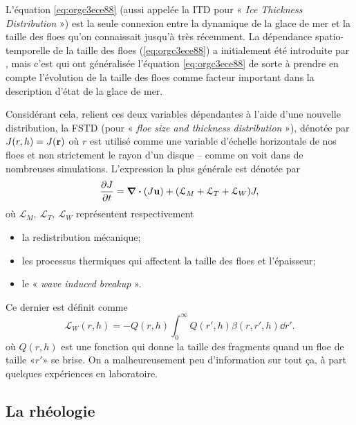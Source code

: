 \documentclass[10pt]{article}
\numberwithin{equation}{section}
\newcommand{\uu}{\vb{u}}
\begin{document}
L'équation \ref{eq:orgc3ece88} (aussi appelée la ITD pour « \emph{Ice Thickness Distribution} »)  est la seule connexion entre la dynamique de la glace de mer et la taille des floes qu'on connaissait jusqu'à très récemment.
La dépendance spatio-temporelle de la taille des floes (\ref{eq:orgc3ece88}) a initialement été introduite par \Textcite{zhang2015sea}, mais c'est \Textcite{horvat2015prognostic} qui ont généralisée l'équation \ref{eq:orgc3ece88} de sorte à prendre en compte l'évolution de la taille des floes comme facteur important dans la description d'état de la glace de mer.\bigskip

Considérant cela, \Textcite{horvat2015prognostic} relient ces deux variables dépendantes à l'aide d'une nouvelle distribution, la FSTD (pour « \emph{floe size and thickness distribution} »), dénotée par \(J(r,h)=J(\vb{r})\) où \(r\) est utilisé comme une variable d'échelle horizontale de nos floes et non strictement le rayon d'un disque -- comme on voit dans de nombreuses simulations.
L'expression la plus générale est dénotée par 
\begin{equation}
   \pdv{J}{t} = \-\divergence{(J\uu)} + \qty(\mathcal{L}_M + \mathcal{L}_T + \mathcal{L}_W) J,
\end{equation}
où \(\mathcal{L}_M ,\ \mathcal{L}_T ,\ \mathcal{L}_W\) représentent respectivement
\begin{itemize}
\item la redistribution mécanique;
\item les processus thermiques qui affectent la taille des floes et l'épaisseur;
\item le « \emph{wave induced breakup} ».
\end{itemize}
Ce dernier est définit comme
\begin{equation}
   \mathcal{L}_W(r,h) = -Q(r,h) \int_0^\infty Q(r',h) \beta(r,r',h) \dd r'.
\end{equation}
où \(Q(r,h)\) est une fonction qui donne la taille des fragments quand un floe de taille «\(r'\)» se brise.
On a malheureusement peu d'information sur tout ça, à part quelques expériences en laboratoire.
\subsection{La rhéologie}
\label{sec:orgbd76d7b}
\end{document}
